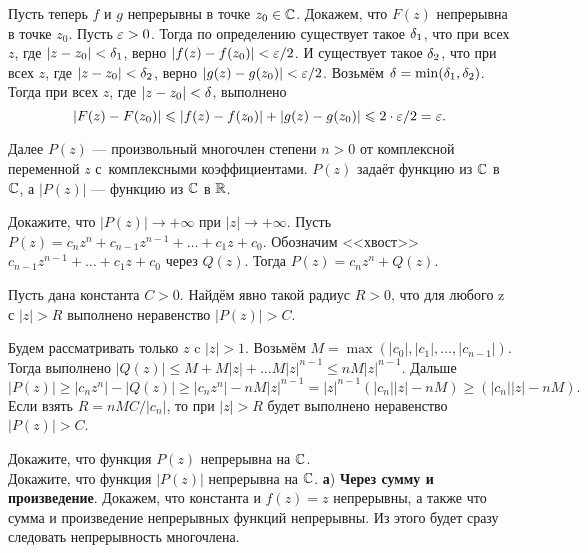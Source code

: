 \documentclass[a4paper, 12pt]{article}
\begin{document}
Пусть теперь $f$ и $g$ непрерывны в точке $z_0\in\mathbb{C}$.
Докажем, что $F(z)$ непрерывна в точке $z_0$.
Пусть $\varepsilon>0$.
Тогда по определению существует такое $\delta_1$, что при всех $z$, где $|z-z_0|<\delta_1$, верно $|f(z)-f(z_0)|<\varepsilon/2$.
И существует такое $\delta_2$, что при всех $z$, где $|z-z_0|<\delta_2$, верно $|g(z)-g(z_0)|<\varepsilon/2$.
Возьмём $\delta = \min(\delta_1, \delta_2)$.
Тогда при всех $z$, где $|z-z_0|<\delta$, выполнено
$$|F(z)-F(z_0)| \leqslant |f(z)-f(z_0)|+|g(z)-g(z_0)|\leqslant 2\cdot\varepsilon/2 = \varepsilon.$$


Далее $P(z)$ --- произвольный многочлен степени $n>0$ от комплексной
переменной $z$ с~комплексными коэффициентами.
$P(z)$ задаёт функцию из $\mathbb{C}$ в $\mathbb{C}$, %
а $|P(z)|$ --- функцию из $\mathbb{C}$ в $\mathbb{R}$.















 Докажите, что
$|P(z)|\rightarrow+\infty$ при $|z|\rightarrow+\infty$.
Пусть $P(z) = c_n z^n + c_{n-1} z^{n-1} + \ldots + c_1 z + c_0$.
Обозначим <<хвост>> $c_{n-1} z^{n-1} + \ldots + c_1 z + c_0$ через $Q(z)$.
Тогда $P(z) = c_n z^n + Q(z)$.

Пусть дана константа $C>0$.
Найдём явно такой радиус $R>0$, что для любого z с $|z|>R$ выполнено неравенство $|P(z)|>C$.

Будем рассматривать только $z$ c $|z|>1$.
Возьмём $M = \max(|c_0|, |c_1|, \ldots, |c_{n-1}|)$.
Тогда выполнено $|Q(z)|\leq M+M|z|+\ldots M |z|^{n-1} \leq n M |z|^{n-1}$.
Дальше
$$|P(z)| \geq |c_n z^n| - |Q(z)| \geq |c_n z^n| - n M |z|^{n-1} = |z|^{n-1} (|c_n| |z| - nM) \geq (|c_n| |z| - nM).$$
Если взять $R = nMC/|c_n|$, то при $|z|>R$ будет выполнено неравенство $|P(z)|>C$.












 
Докажите, что функция $P(z)$ непрерывна на $\mathbb{C}$.\\
Докажите, что функция $|P(z)|$ непрерывна на $\mathbb{C}$.
\textbf{а}) \textbf{Через сумму и произведение}.
Докажем, что константа и $f(z)=z$ непрерывны, а также что сумма и произведение непрерывных функций непрерывны.
Из этого будет сразу следовать непрерывность многочлена.
\end{document}
